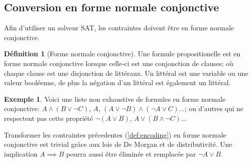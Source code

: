 \documentclass[french, 12pt, letterpaper]{article}
\theoremstyle{definition}
\newtheorem{definition}{Définition}[subsection]
\theoremstyle{proposition}
\theoremstyle{example}
\newtheorem{example}{Exemple}[definition]
\begin{document}
    \subsection{Conversion en forme normale conjonctive}
    \label{sec:cnf}

    Afin d'utiliser un solveur SAT, les contraintes doivent être en forme normale conjonctive.

    \begin{definition}[Forme normale conjonctive]
        Une formule propositionelle est en forme normale conjonctive lorsque celle-ci est une conjonction de clauses; où
        chaque clause est une disjonction de littéraux.
        Un littéral est une variable ou une valeur booléenne, de plus la négation d'un littéral est également un littéral.
    \end{definition}

    \begin{example}
        Voici une liste non exhaustive de formules en forme normale conjonctive: $A \land (B \lor \lnot C)$, $A$, $(A \lor \lnot B) \land (\lnot A \lor C)$...; 
        ou d'autres qui ne respectent pas cette propriété $\lnot (A \lor B)$, $A \lor (B \land \lnot C)$... 
    \end{example}

    Transformer les contraintes précedentes (\ref{def:encoding}) en forme normale conjonctive est trivial grâce aux lois de De Morgan et de distributivité.
    Une implication $A \implies B$ pourra aussi être éliminée et remplacée par $\lnot A \lor B$.
\end{document}
